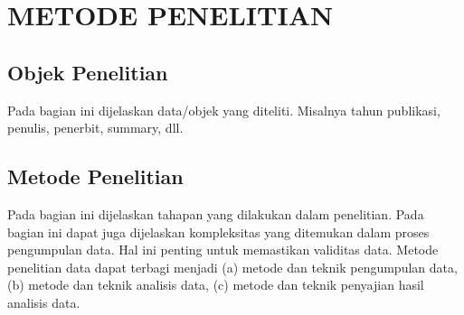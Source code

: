 \chapter{METODE PENELITIAN}

\section{Objek Penelitian}
Pada bagian ini dijelaskan data/objek yang diteliti. Misalnya tahun publikasi, penulis, penerbit, summary, dll. 

\section{Metode Penelitian}
Pada bagian ini dijelaskan tahapan yang dilakukan dalam penelitian. Pada bagian ini dapat juga dijelaskan kompleksitas yang ditemukan dalam proses pengumpulan data. Hal ini penting untuk memastikan validitas data. Metode penelitian data dapat terbagi menjadi (a) metode dan teknik pengumpulan data, (b) metode dan teknik analisis data, (c) metode dan teknik penyajian hasil analisis data.
  